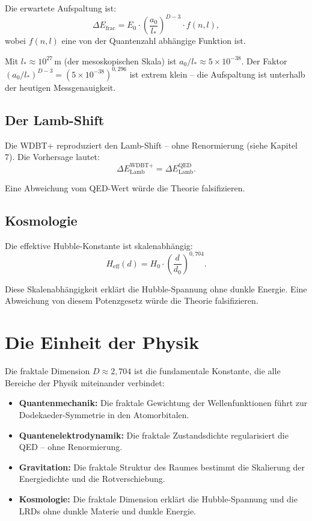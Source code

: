 Die erwartete Aufspaltung ist:
\begin{equation}
\Delta E_{\text{frac}} = E_0 \cdot \left( \frac{a_0}{l_*} \right)^{D-3} \cdot f(n,l), \tag{10.1}
\end{equation}
wobei \( f(n,l) \) eine von der Quantenzahl abhängige Funktion ist.

Mit \( l_* \approx 10^{27} \, \text{m} \) (der mesoskopischen Skala) ist \( a_0/l_* \approx 5 \times 10^{-38} \). Der Faktor
\( (a_0/l_*)^{D-3} = (5 \times 10^{-38})^{0,296} \) ist extrem klein – die Aufspaltung ist unterhalb der heutigen Messgenauigkeit.

\subsection{Der Lamb-Shift}

Die WDBT+ reproduziert den Lamb-Shift – ohne Renormierung (siehe Kapitel 7). Die Vorhersage lautet:
\begin{equation}
\Delta E_{\text{Lamb}}^{\text{WDBT+}} = \Delta E_{\text{Lamb}}^{\text{QED}}. \tag{10.2}
\end{equation}

Eine Abweichung vom QED-Wert würde die Theorie falsifizieren.

\subsection{Kosmologie}

Die effektive Hubble-Konstante ist skalenabhängig:
\begin{equation}
H_{\text{eff}}(d) = H_0 \cdot \left( \frac{d}{d_0} \right)^{0,704}. \tag{10.3}
\end{equation}

Diese Skalenabhängigkeit erklärt die Hubble-Spannung ohne dunkle Energie. Eine Abweichung von diesem Potenzgesetz würde die Theorie falsifizieren.

\section{Die Einheit der Physik}

Die fraktale Dimension \( D \approx 2,704 \) ist die fundamentale Konstante, die alle Bereiche der Physik miteinander verbindet:

\begin{itemize}
    \item \textbf{Quantenmechanik:} Die fraktale Gewichtung der Wellenfunktionen führt zur Dodekaeder-Symmetrie in den Atomorbitalen.
    \item \textbf{Quantenelektrodynamik:} Die fraktale Zustandsdichte regularisiert die QED – ohne Renormierung.
    \item \textbf{Gravitation:} Die fraktale Struktur des Raumes bestimmt die Skalierung der Energiedichte und die Rotverschiebung.
    \item \textbf{Kosmologie:} Die fraktale Dimension erklärt die Hubble-Spannung und die LRDs ohne dunkle Materie und dunkle Energie.
\end{itemize}

